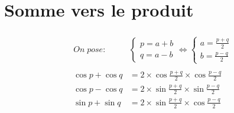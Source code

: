 \documentclass[a4paper, 12pt]{article}
\begin{document}
	\section{Somme vers le produit}
	\begin{gather*}
		\begin{split}
			On\;pose:&
			\begin{cases}
				p = a + b\\
				q = a - b	
			\end{cases}
			\Leftrightarrow
			\begin{cases}
				a = \frac{p+q}{2}\\
				b = \frac{p-q}{2}
			\end{cases}
			\\\\
			\cos{p}+\cos{q} &= 2\times\cos{\frac{p+q}{2}}\times\cos{\frac{p-q}{2}}\\
			\cos{p}-\cos{q} &= 2\times\sin{\frac{p+q}{2}}\times\sin{\frac{p-q}{2}}\\
			\sin{p}+\sin{q} &= 2\times\sin{\frac{p+q}{2}}\times\cos{\frac{p-q}{2}}
		\end{split}
	\end{gather*}

	\newpage
\end{document}
